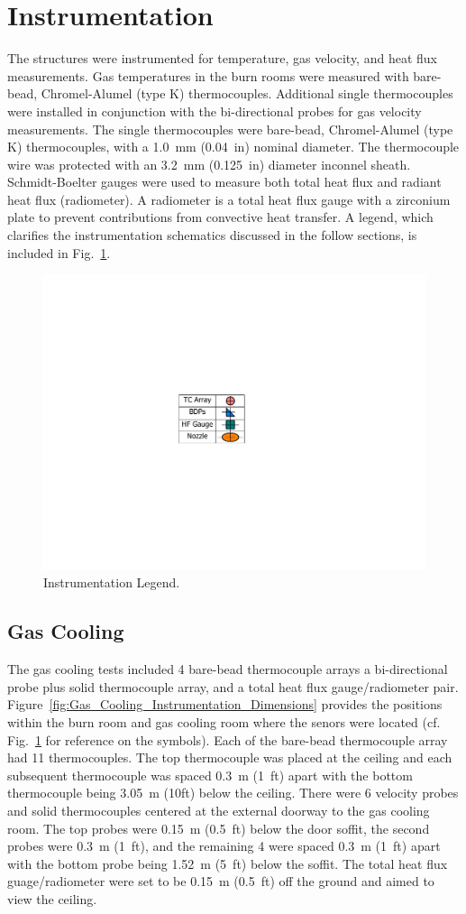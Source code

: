 \documentclass[12pt,oneside]{book}
\begin{document}
\clearpage

\section{Instrumentation}
\label{sec:Instrumentation}

The structures were instrumented for temperature, gas velocity, and heat flux measurements. Gas temperatures in the burn rooms were measured with bare-bead, Chromel-Alumel (type K) thermocouples. Additional single thermocouples were installed in conjunction with the bi-directional probes for gas velocity measurements. The single thermocouples were bare-bead, Chromel-Alumel (type K) thermocouples, with a 1.0~mm (0.04~in) nominal diameter. The thermocouple wire was protected with an 3.2~mm (0.125~in) diameter inconnel sheath. Schmidt-Boelter gauges were used to measure both total heat flux and radiant heat flux (radiometer). A radiometer is a total heat flux gauge with a zirconium plate to prevent contributions from convective heat transfer. A legend, which clarifies the instrumentation schematics discussed in the follow sections, is included in Fig.~\ref{fig:Instrumentation_Legend}.

\begin{figure}[!ht]
	\includegraphics[width=.35\columnwidth]{../Figures/Floor_Plans/PDFs/DelCo_2012_Instrumentation_Legend.pdf}
	\caption{Instrumentation Legend.}
	\label{fig:Instrumentation_Legend}
\end{figure}

\subsection{Gas Cooling}
\label{subsec:Gas_Cooling_Instrumentation}

The gas cooling tests included 4 bare-bead thermocouple arrays  a bi-directional probe plus solid thermocouple array, and a total heat flux gauge/radiometer pair. Figure~\ref{fig:Gas_Cooling_Instrumentation_Dimensions} provides the positions within the burn room and gas cooling room where the senors were located (cf. Fig.~\ref{fig:Instrumentation_Legend} for reference on the symbols). Each of the bare-bead thermocouple array had 11 thermocouples. The top thermocouple was placed at the ceiling and each subsequent thermocouple was spaced 0.3~m (1~ft) apart with the bottom thermocouple being 3.05~m (10ft) below the ceiling. There were 6 velocity probes and solid thermocouples centered at the external doorway to the gas cooling room. The top probes were 0.15~m (0.5~ft) below the door soffit, the second probes were 0.3~m (1~ft), and the remaining 4 were spaced 0.3~m (1~ft) apart with the bottom probe being 1.52~m (5~ft) below the soffit. The total heat flux guage/radiometer were set to be 0.15~m (0.5~ft) off the ground and aimed to view the ceiling.
\end{document}
